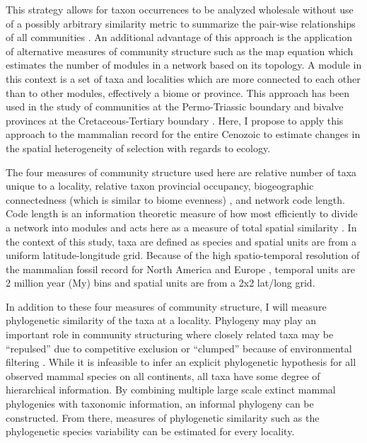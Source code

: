 \documentclass[11pt,letterpaper]{article}
\begin{document}
This strategy allows for taxon occurrences to be analyzed wholesale without use of a possibly arbitrary similarity metric to summarize the pair-wise relationships of all communities \citep{Sidor2013}. An additional advantage of this approach is the application of alternative measures of community structure such as the map equation \citep{Rosvall2008,Rosvall2009a} which estimates the number of modules in a network based on its topology. A module in this context is a set of taxa and localities which are more connected to each other than to other modules, effectively a biome or province. This approach has been used in the study of communities at the Permo-Triassic boundary \citep{Sidor2013} and bivalve provinces at the Cretaceous-Tertiary boundary \citep{Vilhena2013}. Here, I propose to apply this approach to the mammalian record for the entire Cenozoic to estimate changes in the spatial heterogeneity of selection with regards to ecology.

The four measures of community structure used here are relative number of taxa unique to a locality, relative taxon provincial occupancy, biogeographic connectedness (which is similar to biome evenness) \citep{Sidor2013}, and network code length. Code length is an information theoretic measure of how most efficiently to divide a network into modules and acts here as a measure of total spatial similarity \citep{Rosvall2008,Rosvall2009a}. In the context of this study, taxa are defined as species and spatial units are from a uniform latitude-longitude grid. Because of the high spatio-temporal resolution of the mammalian fossil record for North America and Europe \citep{Alroy2009,Marcot2014,Fortelius2002,Jernvall2004}, temporal units are 2 million year (My) bins and spatial units are from a 2x2 lat/long grid.

In addition to these four measures of community structure, I will measure phylogenetic similarity of the taxa at a locality. Phylogeny may play an important role in community structuring where closely related taxa may be ``repulsed'' due to competitive exclusion or ``clumped'' because of environmental filtering \citep{Webb2002}. While it is infeasible to infer an explicit phylogenetic hypothesis for all observed mammal species on all continents, all taxa have some degree of hierarchical information. By combining multiple large scale extinct mammal phylogenies with taxonomic information, an informal phylogeny can be constructed. From there, measures of phylogenetic similarity such as the phylogenetic species variability \citep{Helmus2007a} can be estimated for every locality. 
\end{document}
